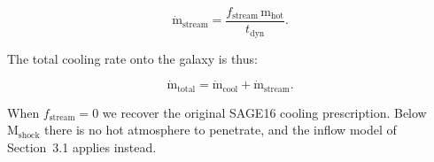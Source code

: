 \begin{equation}
\dot{\mathrm{m}}_{\mathrm{stream}} =
\frac{f_{\mathrm{stream}}\, \mathrm{m_{hot}}}{t_{\mathrm{dyn}}}.
\label{eq:mstream}
\end{equation}

The total cooling rate onto the galaxy is thus:

\begin{equation}
\dot{\mathrm{m}}_{\mathrm{total}} =
\dot{\mathrm{m}}_{\mathrm{cool}} + \dot{\mathrm{m}}_{\mathrm{stream}}.
\label{eq:mtotal}
\end{equation}

When $f_{\mathrm{stream}} = 0$ we recover the original SAGE16 cooling
prescription. Below $\mathrm{M_{shock}}$ there is no hot atmosphere to
penetrate, and the inflow model of Section~3.1 applies instead.


